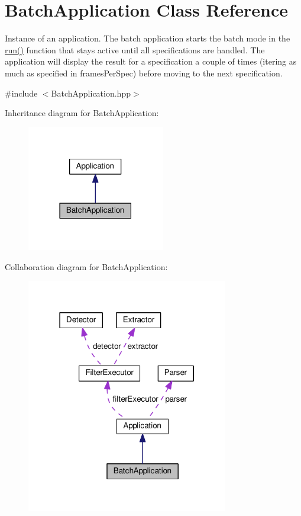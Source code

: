 \hypertarget{classBatchApplication}{}\section{Batch\+Application Class Reference}
\label{classBatchApplication}


Instance of an application. The batch application starts the batch mode in the \hyperlink{classBatchApplication_a5338e7513a806b5e751f92d0704d0f8b}{run()} function that stays active until all specifications are handled. The application will display the result for a specification a couple of times (itering as much as specified in frames\+Per\+Spec) before moving to the next specification.  




{\ttfamily \#include $<$Batch\+Application.\+hpp$>$}



Inheritance diagram for Batch\+Application\+:\nopagebreak
\begin{figure}[H]
\begin{center}
\leavevmode
\includegraphics[width=170pt]{classBatchApplication__inherit__graph}
\end{center}
\end{figure}


Collaboration diagram for Batch\+Application\+:\nopagebreak
\begin{figure}[H]
\begin{center}
\leavevmode
\includegraphics[width=250pt]{classBatchApplication__coll__graph}
\end{center}
\end{figure}
